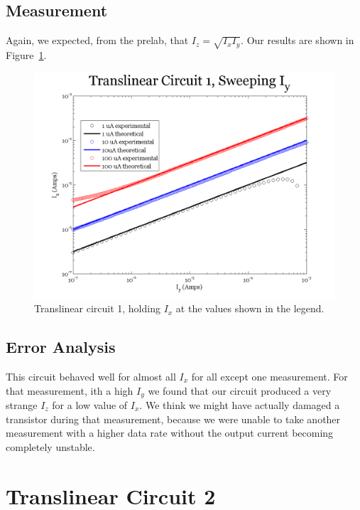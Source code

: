 \documentclass{article}
\begin{document}
\subsection*{Measurement}


Again, we expected, from the prelab, that $I_z = \sqrt{I_xI_y}$.  Our results are shown in Figure~\ref{fig:exp2sweepy}.

\begin{figure}[H]
\begin{center}
\includegraphics[scale=.75]{exp2_sweepy.png}
\caption{Translinear circuit 1, holding $I_x$ at the values shown in the legend.}
\label{fig:exp2sweepy}
\end{center}
\end{figure}

\subsection*{Error Analysis}

This circuit behaved well for almost all $I_x$ for all except one measurement.  For that measurement, ith a high $I_y$ we found that our circuit produced a very strange $I_z$ for a low value of $I_x$.  We think we might have actually damaged a transistor during that measurement,  because we were unable to take another measurement with a higher data rate without the output current becoming completely unstable.  

\section*{Translinear Circuit 2}
\end{document}
